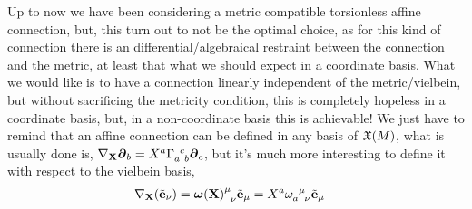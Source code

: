 Up to now we have been considering a metric compatible torsionless affine connection, but, this turn out to not be the optimal choice, as for this kind of connection 
there is an differential/algebraical restraint between the connection and the metric, at least that what we should expect in a coordinate basis. What we would like is 
to have a connection linearly independent of the metric/vielbein, but without sacrificing the metricity condition, this is completely hopeless in a 
coordinate basis, but, in a non-coordinate basis this is achievable! We just have to remind that an affine connection can be defined in any basis of $\mathfrak X\qty(M)$, what 
is usually done is, $\nabla_{\vb X}\boldsymbol\partial_b=X^a\tensor{\Gamma}{_a^c_b}\boldsymbol\partial_c$, but it's much more interesting to define it with respect to the vielbein 
basis,
\begin{align*}
    \nabla_{\vb X}\qty(\tilde{\vb e}_\nu)&=\tensor{{\boldsymbol\omega(\vb X)}}{^\mu_\nu}\tilde{\vb e}_\mu=X^a\tensor{\omega}{_a^\mu_\nu}\tilde{\vb e}_\mu
\end{align*}

